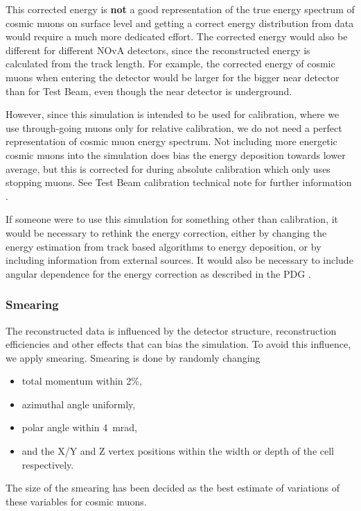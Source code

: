 This corrected energy is \textbf{not} a good representation of the true energy spectrum of cosmic muons on surface level and getting a correct energy distribution from data would require a much more dedicated effort. The corrected energy would also be different for different NOvA detectors, since the reconstructed energy is calculated from the track length. For example, the corrected energy of cosmic muons when entering the detector would be larger for the bigger near detector than for Test Beam, even though the near detector is underground. 

However, since this simulation is intended to be used for calibration, where we use through-going muons only for relative calibration, we do not need a perfect representation of cosmic muon energy spectrum. Not including more energetic cosmic muons into the simulation does bias the energy deposition towards lower average, but this is corrected for during absolute calibration which only uses stopping muons. See Test Beam calibration technical note for further information \cite{NOVA-doc-60592}.

If someone were to use this simulation for something other than calibration, it would be necessary to rethink the energy correction, either by changing the energy estimation from track based algorithms to energy deposition, or by including information from external sources. It would also be necessary to include angular dependence for the energy correction as described in the PDG \cite{rpp2022-rev-cosmic-rays.pdf}.

\subsubsection*{Smearing}
The reconstructed data is influenced by the detector structure, reconstruction efficiencies and other effects that can bias the simulation. To avoid this influence, we apply smearing. Smearing is done by randomly changing
\begin{itemize}
\item total momentum within 2\%,
\item azimuthal angle uniformly,
\item polar angle within 4~mrad,
\item and the X/Y and Z vertex positions within the width or depth of the cell respectively.
\end{itemize}

The size of the smearing has been decided as the best estimate of variations of these variables for cosmic muons.

